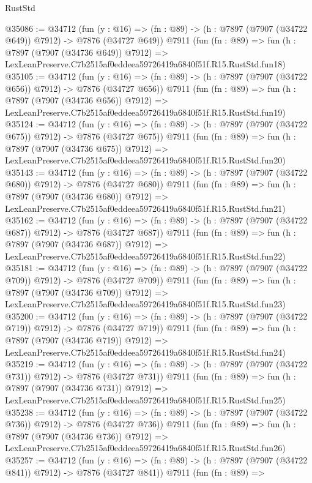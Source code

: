 \begin{lexlean}{RustStd}
\begin{coremodule}
@35086 := @34712
    (fun (y : @16) => (fn : @89) -> (h : @7897 (@7907 (@34722 @649)) @7912) -> @7876 (@34727 @649))
    @7911
    (fun (fn : @89) =>
    fun (h : @7897 (@7907 (@34736 @649)) @7912) =>
    LexLeanPreserve.C7b2515af0eddeea59726419a6840f51f.R15.RustStd.fun18)
@35105 := @34712
    (fun (y : @16) => (fn : @89) -> (h : @7897 (@7907 (@34722 @656)) @7912) -> @7876 (@34727 @656))
    @7911
    (fun (fn : @89) =>
    fun (h : @7897 (@7907 (@34736 @656)) @7912) =>
    LexLeanPreserve.C7b2515af0eddeea59726419a6840f51f.R15.RustStd.fun19)
@35124 := @34712
    (fun (y : @16) => (fn : @89) -> (h : @7897 (@7907 (@34722 @675)) @7912) -> @7876 (@34727 @675))
    @7911
    (fun (fn : @89) =>
    fun (h : @7897 (@7907 (@34736 @675)) @7912) =>
    LexLeanPreserve.C7b2515af0eddeea59726419a6840f51f.R15.RustStd.fun20)
@35143 := @34712
    (fun (y : @16) => (fn : @89) -> (h : @7897 (@7907 (@34722 @680)) @7912) -> @7876 (@34727 @680))
    @7911
    (fun (fn : @89) =>
    fun (h : @7897 (@7907 (@34736 @680)) @7912) =>
    LexLeanPreserve.C7b2515af0eddeea59726419a6840f51f.R15.RustStd.fun21)
@35162 := @34712
    (fun (y : @16) => (fn : @89) -> (h : @7897 (@7907 (@34722 @687)) @7912) -> @7876 (@34727 @687))
    @7911
    (fun (fn : @89) =>
    fun (h : @7897 (@7907 (@34736 @687)) @7912) =>
    LexLeanPreserve.C7b2515af0eddeea59726419a6840f51f.R15.RustStd.fun22)
@35181 := @34712
    (fun (y : @16) => (fn : @89) -> (h : @7897 (@7907 (@34722 @709)) @7912) -> @7876 (@34727 @709))
    @7911
    (fun (fn : @89) =>
    fun (h : @7897 (@7907 (@34736 @709)) @7912) =>
    LexLeanPreserve.C7b2515af0eddeea59726419a6840f51f.R15.RustStd.fun23)
@35200 := @34712
    (fun (y : @16) => (fn : @89) -> (h : @7897 (@7907 (@34722 @719)) @7912) -> @7876 (@34727 @719))
    @7911
    (fun (fn : @89) =>
    fun (h : @7897 (@7907 (@34736 @719)) @7912) =>
    LexLeanPreserve.C7b2515af0eddeea59726419a6840f51f.R15.RustStd.fun24)
@35219 := @34712
    (fun (y : @16) => (fn : @89) -> (h : @7897 (@7907 (@34722 @731)) @7912) -> @7876 (@34727 @731))
    @7911
    (fun (fn : @89) =>
    fun (h : @7897 (@7907 (@34736 @731)) @7912) =>
    LexLeanPreserve.C7b2515af0eddeea59726419a6840f51f.R15.RustStd.fun25)
@35238 := @34712
    (fun (y : @16) => (fn : @89) -> (h : @7897 (@7907 (@34722 @736)) @7912) -> @7876 (@34727 @736))
    @7911
    (fun (fn : @89) =>
    fun (h : @7897 (@7907 (@34736 @736)) @7912) =>
    LexLeanPreserve.C7b2515af0eddeea59726419a6840f51f.R15.RustStd.fun26)
@35257 := @34712
    (fun (y : @16) => (fn : @89) -> (h : @7897 (@7907 (@34722 @841)) @7912) -> @7876 (@34727 @841))
    @7911
    (fun (fn : @89) =>

\end{coremodule}
\end{lexlean}
